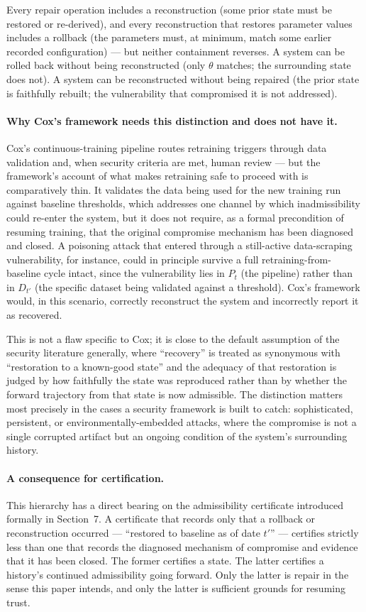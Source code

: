 \documentclass[11pt]{article}
\begin{document}
\noindent Every repair operation includes a reconstruction (some prior state must be restored or re-derived), and every reconstruction that restores parameter values includes a rollback (the parameters must, at minimum, match some earlier recorded configuration) --- but neither containment reverses. A system can be rolled back without being reconstructed (only $\theta$ matches; the surrounding state does not). A system can be reconstructed without being repaired (the prior state is faithfully rebuilt; the vulnerability that compromised it is not addressed).

\paragraph{Why Cox's framework needs this distinction and does not have it.} Cox's continuous-training pipeline routes retraining triggers through data validation and, when security criteria are met, human review --- but the framework's account of what makes retraining safe to proceed with is comparatively thin. It validates the data being used for the new training run against baseline thresholds, which addresses one channel by which inadmissibility could re-enter the system, but it does not require, as a formal precondition of resuming training, that the original compromise mechanism has been diagnosed and closed. A poisoning attack that entered through a still-active data-scraping vulnerability, for instance, could in principle survive a full retraining-from-baseline cycle intact, since the vulnerability lies in $P_t$ (the pipeline) rather than in $D_{t'}$ (the specific dataset being validated against a threshold). Cox's framework would, in this scenario, correctly reconstruct the system and incorrectly report it as recovered.

This is not a flaw specific to Cox; it is close to the default assumption of the security literature generally, where ``recovery'' is treated as synonymous with ``restoration to a known-good state'' and the adequacy of that restoration is judged by how faithfully the state was reproduced rather than by whether the forward trajectory from that state is now admissible. The distinction matters most precisely in the cases a security framework is built to catch: sophisticated, persistent, or environmentally-embedded attacks, where the compromise is not a single corrupted artifact but an ongoing condition of the system's surrounding history.

\paragraph{A consequence for certification.} This hierarchy has a direct bearing on the admissibility certificate introduced formally in Section~7. A certificate that records only that a rollback or reconstruction occurred --- ``restored to baseline as of date $t'$'' --- certifies strictly less than one that records the diagnosed mechanism of compromise and evidence that it has been closed. The former certifies a state. The latter certifies a history's continued admissibility going forward. Only the latter is repair in the sense this paper intends, and only the latter is sufficient grounds for resuming trust.
\end{document}
